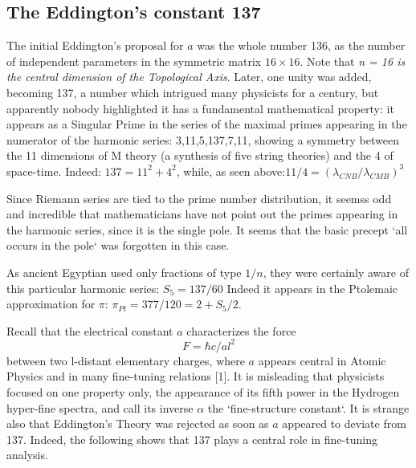 \documentclass[twoside,draft]{article}
\begin{document}
\begin{sloppypar}
{\subsection{The Eddington's constant 137}

The initial Eddington's proposal for $a$ was the whole number 136, as the number of independent parameters in the symmetric matrix $16 \times 16$. Note that \textit{n = 16 is the central dimension of the Topological Axis}. Later, one unity was added, becoming 137, a number which intrigued many physicists for a century, but apparently nobody highlighted it has a fundamental mathematical property: it appears as a Singular Prime in the series of the maximal primes appearing in the numerator of the harmonic
series: 3,11,5,137,7,11, showing a symmetry between the 11 dimensions of M theory (a synthesis of five string theories) and the 4 of space-time. Indeed: $137 = 11^{2} + 4^{2}$, while, as seen above:$11/4 = (\lambda_{CNB}/\lambda_{CMB})^{3}$

Since Riemann series are tied to the prime number distribution, it seemss odd and incredible that mathematicians
have not point out the primes appearing in the harmonic series, since it is the single pole. It seems
that the basic precept `all occurs in the pole` was forgotten in this case. 

As ancient Egyptian used only fractions of type $1/n$, they were certainly aware of this particular harmonic series: 
$S_{5} = 137/60$
Indeed it appears in the Ptolemaic approximation for $\pi$: $\pi_{Pt} = 377/120 = 2 +  S_{5}/2$.

Recall that the electrical constant $a$ characterizes the force $$F =\hbar c/al^{2}$$ between two l-distant
elementary charges, where $a$ appears central in Atomic Physics and in many fine-tuning relations [1]. It is
misleading that physicists focused on one property only, the appearance of its fifth power in the
Hydrogen hyper-fine spectra, and call its inverse $\alpha$ the `fine-structure constant`. It is strange also that
Eddington's Theory was rejected as soon as $a$ appeared to deviate from 137. Indeed, the
following shows that 137 plays a central role in fine-tuning analysis. 

}
\end{sloppypar}
\end{document}
